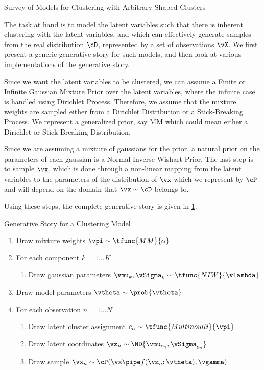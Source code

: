 \documentclass{article}
\begin{document}
\begin{psection}{Survey of Models for Clustering with Arbitrary Shaped Clusters}

	The task at hand is to model the latent variables such that there is inherent clustering with the latent variables, and which can effectively generate samples from the real distribution $\cD$, represented by a set of observations $\vX$. We first present a generic generative story for such models, and then look at various implementations of the generative story.

	Since we want the latent variables to be clustered, we can assume a Finite or Infinite Gaussian Mixture Prior over the latent variables, where the infinite case is handled using Dirichlet Process. Therefore, we assume that the mixture weights are sampled either from a Dirichlet Distribution or a Stick-Breaking Process. We represent a generalized prior, say MM which could mean either a Dirichlet or Stick-Breaking Distribution.

	Since we are assuming a mixture of gaussians for the prior, a natural prior on the parameters of each gaussian is a Normal Inverse-Wishart Prior. The last step is to sample $\vx$, which is done through a non-linear mapping from the latent variables to the parameters of the distribution of $\vx$ which we represent by $\cP$ and will depend on the domain that $\vx \sim \cD$ belongs to.

	Using these steps, the complete generative story is given in \hyperlink{algo:1}{1}.

	\begin{algo}[0.8\textwidth]{Generative Story for a Clustering Model}

		\begin{enumerate}
			\item Draw mixture weights $\vpi \sim \tfunc{MM}{\alpha}$
			\item For each component $k = 1 \dots K$
				\begin{enumerate}
					\item Draw gaussian parameters $\vmu_k, \vSigma_k \sim \tfunc{NIW}{\vlambda}$
				\end{enumerate}
			\item Draw model parameters $\vtheta \sim \prob{\vtheta}$
			\item For each observation $n = 1 \dots N$
				\begin{enumerate}
					\item Draw latent cluster assignment $c_n \sim \tfunc{Multinoulli}{\vpi}$
					\item Draw latent coordinates $\vz_n \sim \ND{\vmu_{c_n}, \vSigma_{c_n}}$
					\item Draw sample $\vx_n \sim \cP(\vx \pipe f(\vz_n; \vtheta), \vgamma)$
				\end{enumerate}
		\end{enumerate}


\end{algo}
\end{psection}
\end{document}
